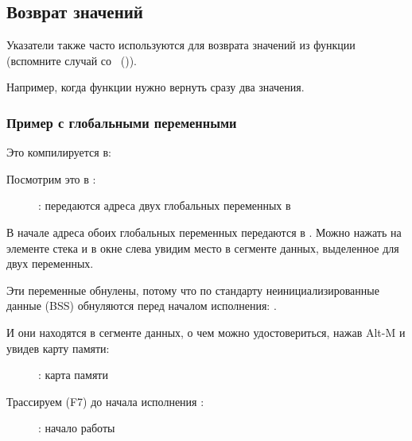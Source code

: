 \subsection{Возврат значений}
\myindex{\CLanguageElements!\Pointers}
\label{label_pointers}

Указатели также часто используются для возврата значений из функции (вспомните случай со \scanf{}~()).

Например, когда функции нужно вернуть сразу два значения.

\subsubsection{Пример с глобальными переменными}



Это компилируется в:



\myindex{\olly}
\clearpage
Посмотрим это в \olly:

\begin{figure}[H]
\centering
{}
\caption{\olly: передаются адреса двух глобальных переменных в \ttfone}
\label{fig:pointers_olly_global_1}
\end{figure}

В начале адреса обоих глобальных переменных передаются в \ttfone.
Можно нажать  на элементе стека и в окне слева 
увидим место в сегменте данных, выделенное для двух переменных.

Эти переменные обнулены, потому что по стандарту неинициализированные данные (\ac{BSS}) 
обнуляются перед началом исполнения: .

\clearpage

И они находятся в сегменте данных, о чем можно удостовериться, нажав Alt-M и увидев карту памяти:

\begin{figure}[H]
\centering
{}
\caption{\olly: карта памяти}
\label{fig:pointers_olly_global_5}
\end{figure}

\clearpage
Трассируем (F7) до начала исполнения \ttfone: 

\begin{figure}[H]
\centering
{}
\caption{\olly: начало работы \ttfone}
\label{fig:pointers_olly_global_2}
\end{figure}

